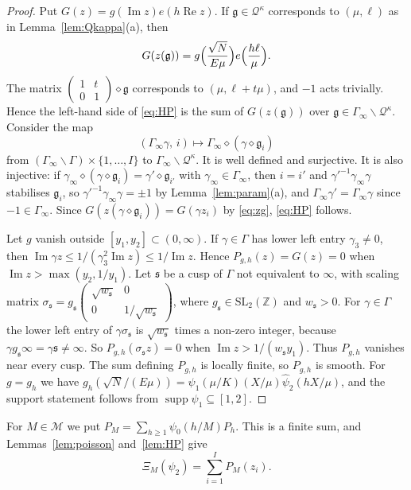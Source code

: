 \documentclass[11pt]{amsart}
\theoremstyle{remark}
\theoremstyle{definition}
\numberwithin{equation}{section}
\newcommand{\Qc}{\mathcal{Q}}
\newcommand{\Mset}{\mathcal{M}}
\newcommand{\Z}{\mathbb{Z}}
\newcommand{\fg}{\mathfrak{g}}
\newcommand{\gs}{\mathfrak{s}}
\newcommand{\SL}{\mathrm{SL}}
\begin{document}
\begin{proof}
Put $G(z)=g(\operatorname{Im}z)e(h\operatorname{Re}z)$. If $\fg\in\Qc^\kappa$ corresponds to $(\mu,\ell)$ as in Lemma~\ref{lem:Qkappa}(a), then
\[
G(z(\fg))=g\Bigl(\frac{\sqrt N}{E\mu}\Bigr)e\Bigl(\frac{h\ell}\mu\Bigr).
\]
The matrix $\left(\begin{smallmatrix}1&t\\0&1\end{smallmatrix}\right)\diamond\fg$ corresponds to $(\mu,\ell+t\mu)$, and $-1$ acts trivially. Hence the left-hand side of \eqref{eq:HP} is the sum of $G(z(\fg))$ over $\fg\in\Gamma_\infty\backslash\Qc^\kappa$. Consider the map
\[
(\Gamma_\infty\gamma,\,i)\longmapsto\Gamma_\infty\diamond(\gamma\diamond\fg_i)
\]
from $(\Gamma_\infty\backslash\Gamma)\times\{1,\dots,I\}$ to $\Gamma_\infty\backslash\Qc^\kappa$. It is well defined and surjective. It is also injective: if $\gamma_\infty\diamond(\gamma\diamond\fg_i)=\gamma'\diamond\fg_{i'}$ with $\gamma_\infty\in\Gamma_\infty$, then $i=i'$ and $\gamma'^{-1}\gamma_\infty\gamma$ stabilises $\fg_i$, so $\gamma'^{-1}\gamma_\infty\gamma=\pm1$ by Lemma~\ref{lem:param}(a), and $\Gamma_\infty\gamma'=\Gamma_\infty\gamma$ since $-1\in\Gamma_\infty$. Since $G(z(\gamma\diamond\fg_i))=G(\gamma z_i)$ by \eqref{eq:zg}, \eqref{eq:HP} follows.

Let $g$ vanish outside $[y_1,y_2]\subset(0,\infty)$. If $\gamma\in\Gamma$ has lower left entry $\gamma_3\ne0$, then $\operatorname{Im}\gamma z\le1/(\gamma_3^2\operatorname{Im}z)\le1/\operatorname{Im}z$. Hence $P_{g,h}(z)=G(z)=0$ when $\operatorname{Im}z>\max(y_2,1/y_1)$. Let $\gs$ be a cusp of $\Gamma$ not equivalent to $\infty$, with scaling matrix $\sigma_\gs=g_\gs\left(\begin{smallmatrix}\sqrt{w_\gs}&0\\0&1/\sqrt{w_\gs}\end{smallmatrix}\right)$, where $g_\gs\in\SL_2(\Z)$ and $w_\gs>0$. For $\gamma\in\Gamma$ the lower left entry of $\gamma\sigma_\gs$ is $\sqrt{w_\gs}$ times a non-zero integer, because $\gamma g_\gs\infty=\gamma\gs\ne\infty$. So $P_{g,h}(\sigma_\gs z)=0$ when $\operatorname{Im}z>1/(w_\gs y_1)$. Thus $P_{g,h}$ vanishes near every cusp. The sum defining $P_{g,h}$ is locally finite, so $P_{g,h}$ is smooth. For $g=g_h$ we have $g_h(\sqrt N/(E\mu))=\psi_1(\mu/K)(X/\mu)\hat\psi_2(hX/\mu)$, and the support statement follows from $\operatorname{supp}\psi_1\subseteq[1,2]$.
\end{proof}

For $M\in\Mset$ we put $P_M=\sum_{h\ge1}\psi_0(h/M)P_h$. This is a finite sum, and Lemmas~\ref{lem:poisson} and~\ref{lem:HP} give
\begin{equation}\label{eq:XiM}
\Xi_M(\psi_2)=\sum_{i=1}^IP_M(z_i).
\end{equation}
\end{document}
